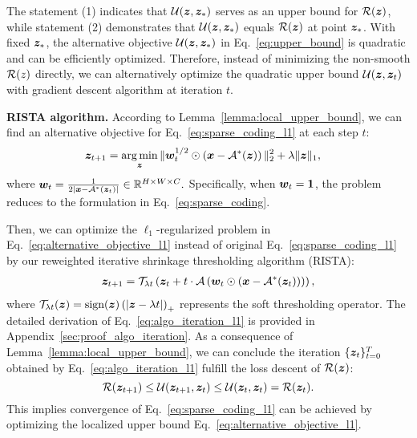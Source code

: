 The statement (1) indicates that ${\mathcal{U}}({\bm{z}},{\bm{z}}_*)$ serves as an upper bound for ${\mathcal{R}}({\bm{z}})$, while statement (2) demonstrates that  ${\mathcal{U}}({\bm{z}},{\bm{z}}_*)$ equals ${\mathcal{R}}({\bm{z}})$ at point ${\bm{z}}_*$.
With fixed ${\bm{z}}_*$, the alternative objective ${\mathcal{U}}({\bm{z}},{\bm{z}}_*)$ in Eq.~\eqref{eq:upper_bound} is quadratic and can be efficiently optimized.
Therefore, instead of minimizing the non-smooth ${\mathcal{R}}(z)$ directly, we can alternatively optimize the quadratic upper bound ${\mathcal{U}}({\bm{z}},{\bm{z}}_t)$ with gradient descent algorithm at iteration $t$.


\textbf{RISTA algorithm.}
According to Lemma~\ref{lemma:local_upper_bound}, we can find an alternative objective for Eq.~\eqref{eq:sparse_coding_l1} at each step $t$:
\begin{equation}
\begin{aligned}
{\bm{z}}_{t+1}&=\operatorname*{arg\,min}_{\bm{z}}  \|{\bm{w}}_t^{1/2} \odot \left({\bm{x}} - {\mathcal{A}}^*({\bm{z}})\right)\|_2^2 + \lambda\|{\bm{z}}\|_1 ,
\label{eq:alternative_objective_l1}
\end{aligned}
\end{equation}
where 
$
{\bm{w}}_t =  \frac{1}{2|{\bm{x}} - {\mathcal{A}}^*({\bm{z}}_t)|} \in \mathbb{R}^{H \times W \times C}.
$
Specifically, when ${\bm{w}}_t = \mathbf{1}$, the problem reduces to the formulation in Eq.~\eqref{eq:sparse_coding}.





Then, we can 
optimize the $\ell_1$-regularized problem in Eq.~\eqref{eq:alternative_objective_l1} instead of original Eq.~\eqref{eq:sparse_coding_l1} by our reweighted iterative  shrinkage thresholding algorithm (RISTA):
\begin{equation}
    \begin{aligned}
        {\bm{z}}_{t+1} = \mathcal{T}_{\lambda t} \left( {\bm{z}}_t + t \cdot {\mathcal{A}} \left(
        {\bm{w}}_t\odot\left({\bm{x}} - {\mathcal{A}}^*({\bm{z}}_t)\right)
        \right)  \right),
        \label{eq:algo_iteration_l1}
    \end{aligned}
\end{equation}
where $\mathcal{T}_{\lambda t}({\bm{z}})=\text{sign}({\bm{z}}) \left(|{\bm{z}}-\lambda t|\right)_+$ represents the soft thresholding operator. The detailed derivation of Eq.~\eqref{eq:algo_iteration_l1} is provided in Appendix~\ref{sec:proof_algo_iteration}.
As a consequence of Lemma~\ref{lemma:local_upper_bound}, we can conclude the iteration $\{{\bm{z}}_t\}_{t=0}^{T}$ obtained by Eq.~\eqref{eq:algo_iteration_l1} fulfill the loss descent of ${\mathcal{R}}({\bm{z}})$:
$${\mathcal{R}}({\bm{z}}_{t+1})\leq{\mathcal{U}}({\bm{z}}_{t+1},{\bm{z}}_t)\leq{\mathcal{U}}({\bm{z}}_t, {\bm{z}}_t)={\mathcal{R}}({\bm{z}}_t).$$
This implies 
convergence of  Eq.~\eqref{eq:sparse_coding_l1}   can be achieved by optimizing the localized upper bound Eq.~\eqref{eq:alternative_objective_l1}. 




